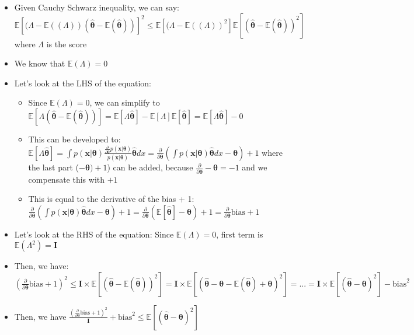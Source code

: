 \begin{itemize}
    \item Given Cauchy Schwarz inequality, we can say:
    $\mathbb{E}[ (\Lambda - \mathbb{E}((\Lambda)) (\hat{\boldsymbol{\theta}} - \mathbb{E}(\hat{\boldsymbol{\theta}})) ]^2 \leq \mathbb{E}[(\Lambda - \mathbb{E}((\Lambda))^2] \mathbb{E}[(\hat{\boldsymbol{\theta}} - \mathbb{E}(\hat{\boldsymbol{\theta}}))^2]$ where $\Lambda$ is the score
    \item We know that $\mathbb{E}(\Lambda) = 0$
    \item Let's look at the LHS of the equation:
    \begin{itemize}
        \item Since $\mathbb{E}(\Lambda) = 0$, we can simplify to $\mathbb{E}[ \Lambda (\hat{\boldsymbol{\theta}} - \mathbb{E}(\hat{\boldsymbol{\theta}})) ] = \mathbb{E}[ \Lambda \hat{\boldsymbol{\theta}}] - \mathbb{E}[\Lambda] \mathbb{E}[\hat{\boldsymbol{\theta}}] = \mathbb{E}[ \Lambda \hat{\boldsymbol{\theta}}] - 0$
        \item This can be developed to: $\mathbb{E}[ \Lambda \hat{\boldsymbol{\theta}}] = \int p( \boldsymbol{x} | \boldsymbol{\theta}) \frac{ \frac{\partial}{\partial \boldsymbol{\theta}} p( \boldsymbol{x} | \boldsymbol{\theta})}{ p( \boldsymbol{x} | \boldsymbol{\theta}) } \hat{\boldsymbol{\theta}} dx = \frac{\partial}{\partial \boldsymbol{\theta}} (\int p( \boldsymbol{x} | \boldsymbol{\theta}) \hat{\boldsymbol{\theta}} dx - \boldsymbol{\theta}) + 1$ where the last part ($- \boldsymbol{\theta}) + 1$) can be added, because $\frac{\partial}{\partial \boldsymbol{\theta}} -\boldsymbol{\theta} = -1$ and we compensate this with $+1$
        \item This is equal to the derivative of the bias + 1: $\frac{\partial}{\partial \boldsymbol{\theta}} (\int p( \boldsymbol{x} | \boldsymbol{\theta}) \hat{\boldsymbol{\theta}} dx - \boldsymbol{\theta}) + 1 = \frac{\partial}{\partial \boldsymbol{\theta}} (\mathbb{E}[\hat{\boldsymbol{\theta}}] - \boldsymbol{\theta}) + 1 = \frac{\partial}{\partial \boldsymbol{\theta}} \textrm{bias} + 1$
    \end{itemize}
    \item Let's look at the RHS of the equation: Since $\mathbb{E}(\Lambda) = 0$, first term is $\mathbb{E}(\Lambda^2) = \boldsymbol{I}$
    \item Then, we have: $(\frac{\partial}{\partial \boldsymbol{\theta}} \textrm{bias} + 1)^2 \leq \boldsymbol{I} \times \mathbb{E}[(\hat{\boldsymbol{\theta}}-\mathbb{E}(\hat{\boldsymbol{\theta}}))^2] = \boldsymbol{I} \times \mathbb{E}[(\hat{\boldsymbol{\theta}} - \boldsymbol{\theta} - \mathbb{E}(\hat{\boldsymbol{\theta}}) + \boldsymbol{\theta})^2] = ... = \boldsymbol{I} \times \mathbb{E}[(\hat{\boldsymbol{\theta}} - \boldsymbol{\theta})^2] - \textrm{bias}^2$
    \item Then, we have $\frac{(\frac{\partial}{\partial \boldsymbol{\theta}} \textrm{bias} + 1)^2}{\boldsymbol{I}} + \textrm{bias}^2 \leq \mathbb{E}[(\hat{\boldsymbol{\theta}}-\boldsymbol{\theta})^2]$
\end{itemize}

